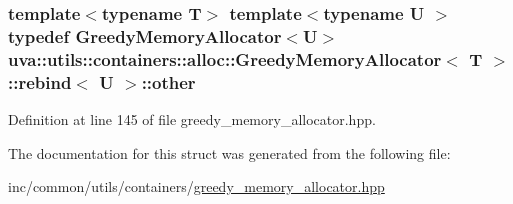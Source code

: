 \subsubsection[{other}]{\setlength{\rightskip}{0pt plus 5cm}template$<$typename T$>$ template$<$typename U $>$ typedef {\bf Greedy\+Memory\+Allocator}$<$U$>$ {\bf uva\+::utils\+::containers\+::alloc\+::\+Greedy\+Memory\+Allocator}$<$ T $>$\+::{\bf rebind}$<$ U $>$\+::{\bf other}}\label{structuva_1_1utils_1_1containers_1_1alloc_1_1_greedy_memory_allocator_1_1rebind_a4c67e954f2b6eb5b5eaae098fe09ef0a}


Definition at line 145 of file greedy\+\_\+memory\+\_\+allocator.\+hpp.



The documentation for this struct was generated from the following file\+:\begin{DoxyCompactItemize}
\item 
inc/common/utils/containers/\hyperlink{greedy__memory__allocator_8hpp}{greedy\+\_\+memory\+\_\+allocator.\+hpp}\end{DoxyCompactItemize}
